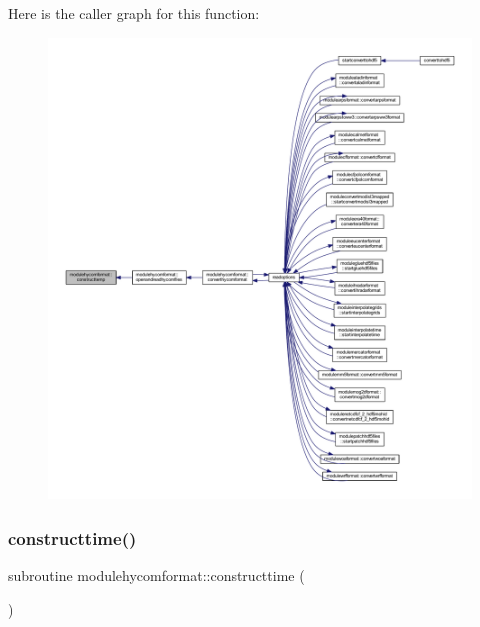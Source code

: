 Here is the caller graph for this function\+:\nopagebreak
\begin{figure}[H]
\begin{center}
\leavevmode
\includegraphics[width=350pt]{namespacemodulehycomformat_a9e994c5d27c453fa808543d635fb116e_icgraph}
\end{center}
\end{figure}
\mbox{\label{namespacemodulehycomformat_ad9fbb9adf5d36be1834e3ca02dacbd89}} 
\subsubsection{\texorpdfstring{constructtime()}{constructtime()}}
{\footnotesize\ttfamily subroutine modulehycomformat\+::constructtime (\begin{DoxyParamCaption}{ }\end{DoxyParamCaption})\hspace{0.3cm}{\ttfamily [private]}}


